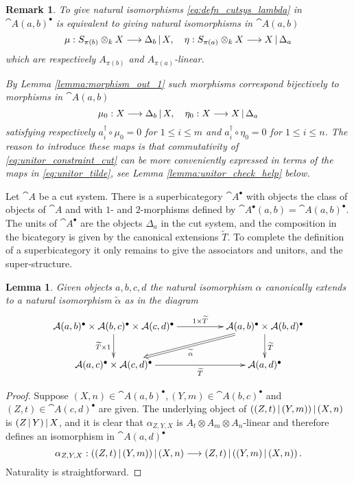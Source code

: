 \documentclass[english,letter paper,12pt,leqno]{article}
\newtheorem{lemma}[theorem]{Lemma}
\theoremstyle{example}
\newtheorem{remark}[theorem]{Remark}
\numberwithin{equation}{section}
\begin{document}
\begin{remark} To give natural isomorphisms \eqref{eq:defn_cutsys_lambda} in $\cat{A}(a,b)^\bullet$ is equivalent to giving natural isomorphisms in $\cat{A}(a,b)$
\begin{equation}\label{eq:unitor_tilde_pre}
\mu: S_{\pi(b)} \otimes_k X \longrightarrow \Delta_b \,|\, X, \quad \eta: S_{\pi(a)} \otimes_k X \longrightarrow X \,|\, \Delta_a
\end{equation}
which are respectively $A_{\pi(b)}$ and $A_{\pi(a)}$-linear. 

By Lemma \ref{lemma:morphism_out_1} such morphisms correspond bijectively to morphisms in $\cat{A}(a,b)$
\begin{equation}\label{eq:unitor_tilde}
\mu_0: X \longrightarrow \Delta_b \,|\, X, \quad \eta_0: X \longrightarrow X \,|\, \Delta_a
\end{equation}
satisfying respectively $a_i^\dagger \circ \mu_0 = 0$ for $1 \le i \le m$ and $a_i^\dagger \circ \eta_0 = 0$ for $1 \le i \le n$. The reason to introduce these maps is that commutativity of \eqref{eq:unitor_constraint_cut} can be more conveniently expressed in terms of the maps in \eqref{eq:unitor_tilde}, see Lemma \ref{lemma:unitor_check_help} below.
\end{remark}

Let $\cat{A}$ be a cut system. There is a superbicategory $\cat{A}^\bullet$ with objects the class of objects of $\cat{A}$ and with $1$- and $2$-morphisms defined by $\cat{A}^\bullet(a,b) = \cat{A}(a,b)^\bullet$. The units of $\cat{A}^\bullet$ are the objects $\Delta_a$ in the cut system, and the composition in the bicategory is given by the canonical extensions $\widetilde{T}$. To complete the definition of a superbicategory it only remains to give the associators and unitors, and the super-structure.

\begin{lemma} Given objects $a,b,c,d$ the natural isomorphism $\alpha$ canonically extends to a natural isomorphism $\widetilde{\alpha}$ as in the diagram
\[
\xymatrix@C+2pc{
\cat{A}(a,b)^\bullet \times \cat{A}(b,c)^\bullet \times \cat{A}(c,d)^\bullet \ar[d]_-{\widetilde{T} \times 1} \ar[r]^-{1 \times \widetilde{T}} & \cat{A}(a,b)^\bullet \times \cat{A}(b,d)^\bullet \ar[d]^{\widetilde{T}} \ar@{=>}[dl]^-{\widetilde{\alpha}}\\
\cat{A}(a,c)^\bullet \times \cat{A}(c,d)^\bullet \ar[r]_-{\widetilde{T}} & \cat{A}(a,d)^\bullet
}
\]
\end{lemma}
\begin{proof}
Suppose $(X,n) \in \cat{A}(a,b)^\bullet, (Y,m) \in \cat{A}(b,c)^\bullet$ and $(Z,t) \in \cat{A}(c,d)^\bullet$ are given. The underlying object of $((Z,t) \,|\, (Y, m)) \,|\, (X,n)$ is $(Z \,|\, Y) \,|\, X$, and it is clear that $\alpha_{Z,Y,X}$ is $A_t \otimes A_m \otimes A_n$-linear and therefore defines an isomorphism in $\cat{A}(a,d)^\bullet$
\[
\alpha_{Z,Y,X}: ((Z,t) \,|\, (Y, m)) \,|\, (X,n) \longrightarrow (Z,t) \,|\, ((Y, m) \,|\, (X,n))\,.
\]
Naturality is straightforward.
\end{proof}
\end{document}

